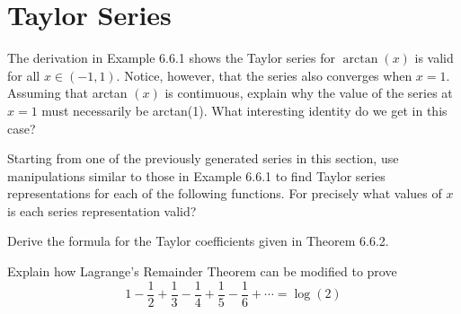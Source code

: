 \section{Taylor Series}

\begin{exercise}
  The derivation in Example 6.6.1 shows the Taylor series for $\arctan (x)$ is valid for all $x \in(-1,1)$. Notice, however, that the series also converges when $x=1$. Assuming that arctan $(x)$ is contimuous, explain why the value of the series at $x=1$ must necessarily be arctan(1). What interesting identity do we get in this case?

\end{exercise}
\begin{solution}
  \TODO
\end{solution}
\begin{exercise}
  Starting from one of the previously generated series in this section, use manipulations similar to those in Example 6.6.1 to find Taylor series representations for each of the following functions. For precisely what values of $x$ is each series representation valid?
\end{exercise}
\begin{solution}
  \TODO
\end{solution}
\begin{exercise}
  Derive the formula for the Taylor coefficients given in Theorem 6.6.2.

\end{exercise}
\begin{solution}
  \TODO
\end{solution}
\begin{exercise}
  Explain how Lagrange's Remainder Theorem can be modified to prove
  $$
  1-\frac{1}{2}+\frac{1}{3}-\frac{1}{4}+\frac{1}{5}-\frac{1}{6}+\cdots=\log (2)
  $$
\end{exercise}
\begin{solution}
  \TODO
\end{solution}
\begin{exercise}

\end{exercise}
